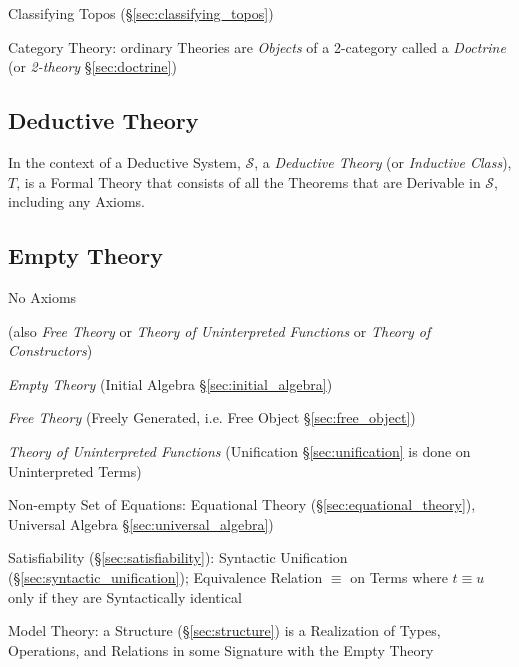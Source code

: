 Classifying Topos (\S\ref{sec:classifying_topos})

Category Theory: ordinary Theories are \emph{Objects} of a 2-category
called a \emph{Doctrine} (or \emph{2-theory} \S\ref{sec:doctrine})



\subsection{Deductive Theory}\label{sec:deductive_theory}

In the context of a Deductive System, $\mathcal{S}$, a \emph{Deductive
  Theory} (or \emph{Inductive Class}), $T$, is a Formal Theory that
consists of all the Theorems that are Derivable in $\mathcal{S}$,
including any Axioms.



\subsection{Empty Theory}\label{sec:empty_theory}

No Axioms

(also \emph{Free Theory} or \emph{Theory of Uninterpreted Functions}
or \emph{Theory of Constructors})

\emph{Empty Theory} (Initial Algebra \S\ref{sec:initial_algebra})

\emph{Free Theory} (Freely Generated, i.e. Free Object
\S\ref{sec:free_object})

\emph{Theory of Uninterpreted Functions} (Unification
\S\ref{sec:unification} is done on Uninterpreted Terms)


Non-empty Set of Equations: Equational Theory
(\S\ref{sec:equational_theory}), Universal Algebra
\S\ref{sec:universal_algebra})

Satisfiability (\S\ref{sec:satisfiability}): Syntactic Unification
(\S\ref{sec:syntactic_unification}); Equivalence Relation $\equiv$ on
Terms where $t \equiv u$ only if they are Syntactically identical

Model Theory: a Structure (\S\ref{sec:structure}) is a Realization of
Types, Operations, and Relations in some Signature with the Empty
Theory




